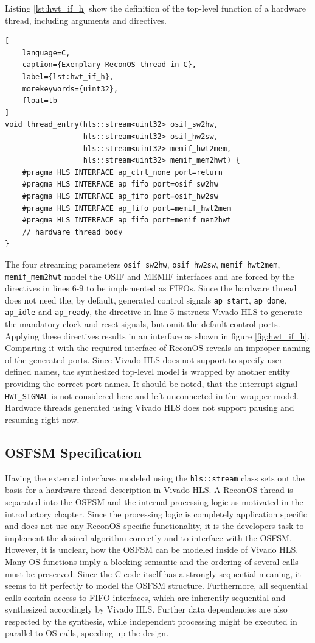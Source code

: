 Listing \ref{lst:hwt_if_h} show the definition of the top-level function of a
hardware thread, including arguments and directives.
\begin{lstlisting}[
	language=C,
	caption={Exemplary ReconOS thread in C},
	label={lst:hwt_if_h},
	morekeywords={uint32},
	float=tb
]
void thread_entry(hls::stream<uint32> osif_sw2hw,
                  hls::stream<uint32> osif_hw2sw,
                  hls::stream<uint32> memif_hwt2mem,
                  hls::stream<uint32> memif_mem2hwt) {
	#pragma HLS INTERFACE ap_ctrl_none port=return
	#pragma HLS INTERFACE ap_fifo port=osif_sw2hw
	#pragma HLS INTERFACE ap_fifo port=osif_hw2sw
	#pragma HLS INTERFACE ap_fifo port=memif_hwt2mem
	#pragma HLS INTERFACE ap_fifo port=memif_mem2hwt
	// hardware thread body
}
\end{lstlisting}
The four streaming parameters \lstinline{osif_sw2hw}, \lstinline{osif_hw2sw},
\lstinline{memif_hwt2mem}, \lstinline{memif_mem2hwt} model the \ac{OSIF} and
\ac{MEMIF} interfaces and are forced by the directives in lines 6-9 to be
implemented as \acp{FIFO}. Since the hardware thread does not need the, by
default, generated control signals \lstinline{ap_start}, \lstinline{ap_done},
\lstinline{ap_idle} and \lstinline{ap_ready}, the directive in line 5
instructs Vivado HLS to generate the mandatory clock and reset signals, but
omit the default control ports. Applying these directives results in an
interface as shown in figure \ref{fig:hwt_if_h}. Comparing it with the
required interface of ReconOS reveals an improper naming of the generated
ports. Since Vivado HLS does not support to specify user defined names, the
synthesized top-level model is wrapped by another entity providing the correct
port names. It should be noted, that the interrupt signal
\lstinline{HWT_SIGNAL} is not considered here and left unconnected in the
wrapper model. Hardware threads generated using Vivado HLS does not support
pausing and resuming right now.

\subsection{\acs{OSFSM} Specification}
Having the external interfaces modeled using the \lstinline{hls::stream}
class sets out the basis for a hardware thread description in Vivado HLS. A
ReconOS thread is separated into the \ac{OSFSM} and the internal processing
logic as motivated in the introductory chapter. Since the processing logic is
completely application specific and does not use any ReconOS specific
functionality, it is the developers task to implement the desired algorithm
correctly and to interface with the \ac{OSFSM}. However, it is unclear, how
the \ac{OSFSM} can be modeled inside of Vivado HLS. Many \ac{OS} functions
imply a blocking semantic and the ordering of several calls must be preserved.
Since the C code itself has a strongly sequential meaning, it seems to fit
perfectly to model the \ac{OSFSM} structure. Furthermore, all sequential calls
contain access to \ac{FIFO} interfaces, which are inherently sequential and
synthesized accordingly by Vivado HLS. Further data dependencies are also
respected by the synthesis, while independent processing might be executed in
parallel to \ac{OS} calls, speeding up the design.

